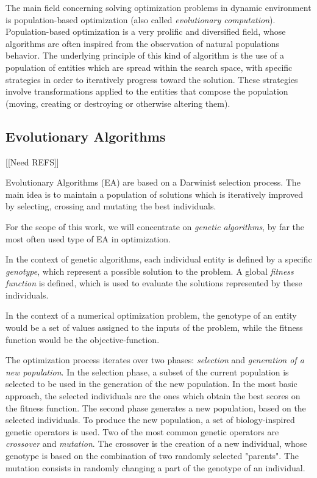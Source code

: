 The main field concerning solving optimization problems in dynamic environment is population-based optimization (also called \emph{evolutionary computation}). Population-based optimization is a very prolific and diversified field, whose algorithms are often inspired from the observation of natural populations behavior. The underlying principle of this kind of algorithm is the use of a population of entities which are spread within the search space, with specific strategies in order to iteratively progress toward the solution. These strategies involve transformations applied to the entities that compose the population (moving, creating or destroying or otherwise altering them).

\subsection{Evolutionary Algorithms}\label{population_based}

[[Need REFS]]

Evolutionary Algorithms (EA) are based on a Darwinist selection process. The main idea is to maintain a population of solutions which is iteratively improved by selecting, crossing and mutating the best individuals.

For the scope of this work, we will concentrate on \emph{genetic algorithms}, by far the most often used type of EA in optimization.

In the context of genetic algorithms, each individual entity is defined by a specific \emph{genotype}, which represent a possible solution to the problem.
A global \emph{fitness function} is defined, which is used to evaluate the solutions represented by these individuals.

In the context of a numerical optimization problem, the genotype of an entity would be a set of values assigned to the inputs of the problem, while the fitness function would be the objective-function.

The optimization process iterates over two phases: \emph{selection} and \emph{generation of a new population}.
In the selection phase, a subset of the current population is selected to be used in the generation of the new population. In the most basic approach, the selected individuals are the ones which obtain the best scores on the fitness function.
The second phase generates a new population, based on the selected individuals. To produce the new population, a set of biology-inspired genetic operators is used. Two of the most common genetic operators are \emph{crossover} and \emph{mutation}. The crossover is the creation of a new individual, whose genotype is based on the combination  of two randomly selected "parents". The mutation consists in randomly changing a part of the genotype of an individual.

